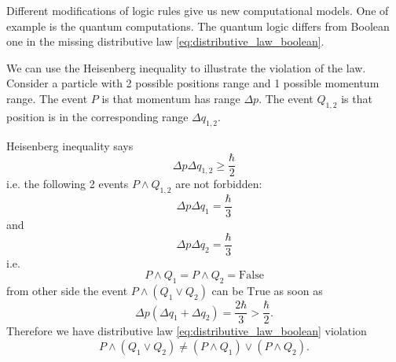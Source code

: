 Different modifications of logic rules give us new computational
models. One of example is the quantum computations. The quantum logic
differs from Boolean one in the missing distributive law
\eqref{eq:distributive_law_boolean}. 

We can use the Heisenberg inequality to illustrate the violation of
the law. Consider a particle with 2 possible positions range and 1
possible momentum range. The event $P$ is that momentum has
range $\Delta p$. The event $Q_{1,2}$ is that position is in the
corresponding range $\Delta q_{1,2}$.

Heisenberg inequality says
\[
\Delta p \Delta q_{1,2} \geq \frac{\hbar}{2}
\]
i.e. the following 2 events $P\land Q_{1,2}$ are not forbidden:
\[
\Delta p \Delta q_1 = \frac{\hbar}{3}
\]
and
\[
\Delta p \Delta q_2 = \frac{\hbar}{3}
\]
i.e.
\[
P \land Q_1 = P \land Q_2 = \mbox{False}
\]
from other side the event $P \land (Q_1 \lor Q_2)$ can be
$\mbox{True}$ as soon as
\[
\Delta p (\Delta q_1 + \Delta q_2) = \frac{2\hbar}{3} >
\frac{\hbar}{2}.
\]
Therefore we have distributive law
\eqref{eq:distributive_law_boolean} violation
\[
P \land (Q_1 \lor Q_2) \ne (P \land Q_1 ) \lor (P \land Q_2).
\]


